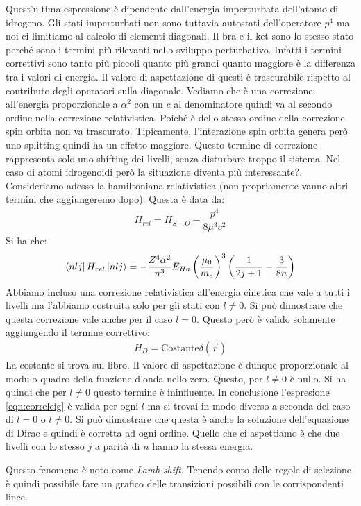 \documentclass[../AppuntiStruttura]{subfiles}
\begin{document}
	Quest'ultima espressione è dipendente dall'energia imperturbata dell'atomo di idrogeno. Gli stati imperturbati non sono tuttavia autostati dell'operatore $ p^{4} $ ma noi ci limitiamo al calcolo di elementi diagonali. Il bra e il ket sono lo stesso stato perché sono i termini più rilevanti nello sviluppo perturbativo. Infatti i termini correttivi sono tanto più piccoli quanto più grandi quanto maggiore è la differenza tra i valori di energia. Il valore di aspettazione di questi è trascurabile rispetto al contributo degli operatori sulla diagonale. Vediamo che è una correzione all'energia proporzionale a $ \alpha^{2} $ con un  $ c $ al denominatore quindi va al secondo ordine nella correzione relativistica. Poiché è dello stesso ordine della correzione spin orbita non va trascurato. Tipicamente, l'interazione spin orbita genera però uno splitting quindi ha un effetto maggiore. Questo termine di correzione rappresenta solo uno shifting dei livelli, senza disturbare troppo il sistema. Nel caso di atomi idrogenoidi però la situazione diventa più interessante?. Consideriamo adesso la hamiltoniana relativistica (non propriamente vanno altri termini che aggiungeremo dopo). Questa è data da:
	\begin{gather}
		H_{rel}=H_{S-O}-\dfrac{p^{4}}{8\mu^{3}c^{2}}
	\end{gather}
	Si ha che:
	\begin{gather}
	\label{eqn:corrreleig}
	\bra{nlj}H_{rel}\ket{nlj}=-\dfrac{Z^{4}\alpha^{2}}{n^{3}}E_{Ha}\left(\dfrac{\mu_{0}}{m_{e}}\right)^{3}\left(\dfrac{1}{2j+1}-\dfrac{3}{8n}\right)
	\end{gather}
	Abbiamo incluso una correzione relativistica all'energia cinetica che vale a tutti i livelli ma l'abbiamo costruita solo per gli stati con $ l\neq0 $. Si può dimostrare che questa correzione vale anche per il caso $ l=0 $. Questo però è valido solamente aggiungendo il termine correttivo:
	\begin{gather}
	H_{D}=\text{Costante}\delta(\vec{r})
	\end{gather}
	La costante si trova sul libro. Il valore di aspettazione è dunque proporzionale al modulo quadro della funzione d'onda nello zero. Questo, per $ l\neq0 $ è nullo. Si ha quindi che per $ l\neq0 $ questo termine è ininfluente. In conclusione l'espresione \ref{eqn:correleig} è valida per ogni $ l $ ma si trovai in modo diverso a seconda del caso di $ l=0 $ o $ l\neq 0 $. Si può dimostrare che questa è anche la soluzione dell'equazione di Dirac e quindi è corretta ad ogni ordine. Quello che ci aspettiamo è che due livelli con lo stesso $ j $ a parità di $ n $ hanno la stessa energia. 
	
	Questo fenomeno è noto come \emph{Lamb shift}. Tenendo conto delle regole di selezione è quindi possibile fare un grafico delle transizioni possibili con le corrispondenti linee.
 
\end{document}

